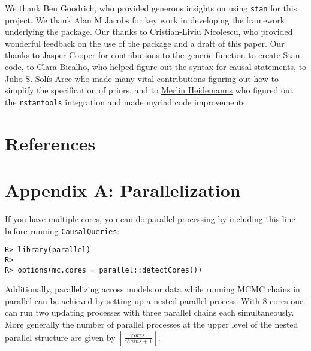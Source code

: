 \documentclass[
  11pt,
  article]{jss}
\begin{document}
\begin{tcolorbox}[enhanced jigsaw, colframe=quarto-callout-color-frame, opacityback=0, colback=white, arc=.35mm, toprule=.15mm, rightrule=.15mm, leftrule=.75mm, breakable, bottomrule=.15mm, left=2mm]

We thank Ben Goodrich, who provided generous insights on using
\texttt{stan} for this project. We thank Alan M Jacobs for key work in
developing the framework underlying the package. Our thanks to
Cristian-Liviu Nicolescu, who provided wonderful feedback on the use of
the package and a draft of this paper. Our thanks to Jasper Cooper for
contributions to the generic function to create Stan code, to
\href{https://clarabicalho.github.io/}{Clara Bicalho}, who helped figure
out the syntax for causal statements, to
\href{https://www.gov.harvard.edu/directory/julio-s-solis-arce/}{Julio
S. Solís Arce} who made many vital contributions figuring out how to
simplify the specification of priors, and to
\href{https://merlinheidemanns.github.io/website/}{Merlin Heidemanns}
who figured out the \texttt{rstantools} integration and made myriad code
improvements.

\end{tcolorbox}

\section*{References}\label{references}

\renewcommand{\bibsection}{}


\newpage{}

\section*{Appendix A: Parallelization}\label{sec-parallel}

If you have multiple cores, you can do parallel processing by including
this line before running \texttt{CausalQueries}:

\begin{verbatim}
R> library(parallel)
R> 
R> options(mc.cores = parallel::detectCores())
\end{verbatim}

Additionally, parallelizing across models or data while running MCMC
chains in parallel can be achieved by setting up a nested parallel
process. With 8 cores one can run two updating processes with three
parallel chains each simultaneously. More generally the number of
parallel processes at the upper level of the nested parallel structure
are given by \(\left \lfloor \frac{cores}{chains + 1} \right \rfloor\).
\end{document}
